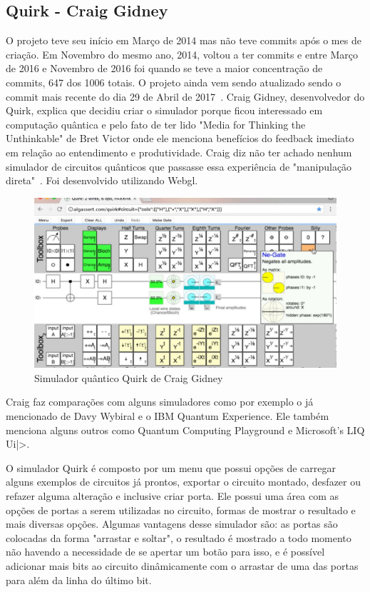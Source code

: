 \documentclass[a4paper, 12pt, oneside]{book}
\begin{document}
\subsection{Quirk - Craig Gidney}

O projeto teve seu início em Março de 2014 mas não teve commits após o mes de criação. Em Novembro do mesmo ano, 2014, voltou a ter commits e entre Março de 2016 e Novembro de 2016 foi quando se teve a maior concentração de commits, 647 dos 1006 totais. O projeto ainda vem sendo atualizado sendo o commit mais recente do dia 29 de Abril de 2017~\cite{gitquirk}. Craig Gidney, desenvolvedor do Quirk, explica que decidiu criar o simulador porque ficou interessado em computação quântica e pelo fato de ter lido "Media for Thinking the Unthinkable" de Bret Victor onde ele menciona benefícios do feedback imediato em relação ao entendimento e produtividade. Craig diz não ter achado nenhum simulador de circuitos quânticos que passasse essa experiência de "manipulação direta"~\cite{quirk}. Foi desenvolvido utilizando Webgl.

\begin{figure}[hbtp]
\centering
\includegraphics[scale=0.36]{quirk.jpg}
\caption{Simulador quântico Quirk de Craig Gidney}
\end{figure}

Craig faz comparações com alguns simuladores como por exemplo o já mencionado de Davy Wybiral e o IBM Quantum Experience. Ele também menciona alguns outros como Quantum Computing Playground e Microsoft's LIQ Ui|>.

O simulador Quirk é composto por um menu que possui opções de carregar alguns exemplos de circuitos já prontos, exportar o circuito montado, desfazer ou refazer alguma alteração e inclusive criar porta. Ele possui uma área com as opções de portas a serem utilizadas no circuito, formas de mostrar o resultado e mais diversas opções. Algumas vantagens desse simulador são: as portas são colocadas da forma "arrastar e soltar", o resultado é mostrado a todo momento não havendo a necessidade de se apertar um botão para isso, e é possível adicionar mais bits ao circuito dinâmicamente com o arrastar de uma das portas para além da linha do último bit.
\end{document}
